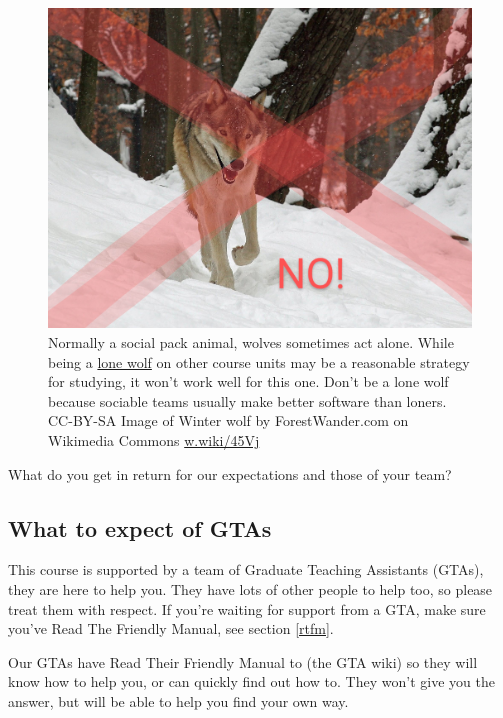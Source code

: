 \documentclass[
]{book}
\begin{document}
\begin{figure}

{\centering \includegraphics[width=0.99\linewidth]{images/lonewolf} 

}

\caption{Normally a social pack animal, wolves sometimes act alone. While being a \href{https://en.wikipedia.org/wiki/Lone_wolf_(trait)}{lone wolf} on other course units may be a reasonable strategy for studying, it won't work well for this one. Don't be a lone wolf because sociable teams usually make better software than loners. CC-BY-SA Image of Winter wolf by ForestWander.com on Wikimedia Commons \href{https://w.wiki/45Vj}{w.wiki/45Vj}}\label{fig:wolf-fig}
\end{figure}



What do you get in return for our expectations and those of your team?

\hypertarget{gtas}{%
\subsection{What to expect of GTAs}\label{gtas}}

This course is supported by a team of Graduate Teaching Assistants (GTAs), they are here to help you. They have lots of other people to help too, so please treat them with respect. If you're waiting for support from a GTA, make sure you've Read The Friendly Manual, see section \ref{rtfm}.

Our GTAs have Read Their Friendly Manual to (the GTA wiki) so they will know how to help you, or can quickly find out how to. They won't give you the answer, but will be able to help you find your own way.
\end{document}
